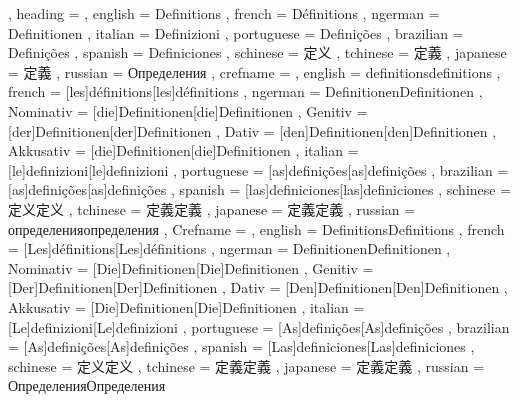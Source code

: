   {
    , heading =   {
                    , english     = Definitions
                    , french      = Définitions
                    , ngerman     = Definitionen
                    , italian     = Definizioni
                    , portuguese  = Definições
                    , brazilian   = Definições
                    , spanish     = Definiciones
                    , schinese    = 定义
                    , tchinese    = 定義
                    , japanese    = 定義
                    , russian     = Определения
                  }
    , crefname =  {
                    , english     = {definitions}{definitions}
                    , french      = [les]{définitions}[les]{définitions}
                    , ngerman     = { {Definitionen}{Definitionen}
                                      , Nominativ = [die]{Definitionen}[die]{Definitionen}
                                      , Genitiv   = [der]{Definitionen}[der]{Definitionen}
                                      , Dativ     = [den]{Definitionen}[den]{Definitionen}
                                      , Akkusativ = [die]{Definitionen}[die]{Definitionen}
                                    }
                    , italian     = [le]{definizioni}[le]{definizioni}
                    , portuguese  = [as]{definições}[as]{definições}
                    , brazilian   = [as]{definições}[as]{definições}
                    , spanish     = [las]{definiciones}[las]{definiciones}
                    , schinese    = {定义}{定义}
                    , tchinese    = {定義}{定義}
                    , japanese    = {定義}{定義}
                    , russian     = {определения}{определения}
                  }
    , Crefname =  {
                    , english     = {Definitions}{Definitions}
                    , french      = [Les]{définitions}[Les]{définitions}
                    , ngerman     = { {Definitionen}{Definitionen}
                                      , Nominativ = [Die]{Definitionen}[Die]{Definitionen}
                                      , Genitiv   = [Der]{Definitionen}[Der]{Definitionen}
                                      , Dativ     = [Den]{Definitionen}[Den]{Definitionen}
                                      , Akkusativ = [Die]{Definitionen}[Die]{Definitionen}
                                    }
                    , italian     = [Le]{definizioni}[Le]{definizioni}
                    , portuguese  = [As]{definições}[As]{definições}
                    , brazilian   = [As]{definições}[As]{definições}
                    , spanish     = [Las]{definiciones}[Las]{definiciones}
                    , schinese    = {定义}{定义}
                    , tchinese    = {定義}{定義}
                    , japanese    = {定義}{定義}
                    , russian     = {Определения}{Определения}
                  }
  }

